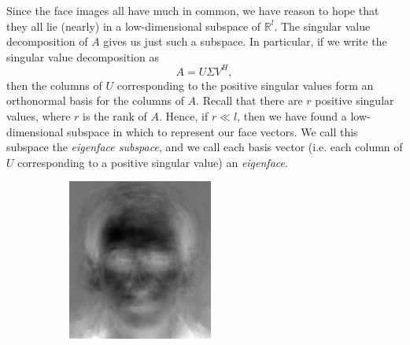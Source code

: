 Since the face images all have much in common, we have reason to hope that they all lie (nearly) in a low-dimensional subspace of $\mathbb{R}^l$.
The singular value decomposition of $A$ gives us just such a subspace.
In particular, if we write the singular value decomposition as
\[
A = U\Sigma V^H,
\]
then the columns of $U$ corresponding to the positive singular values form an orthonormal basis for the columns of $A$.
Recall that there are $r$ positive singular values, where $r$ is the rank of $A$.
Hence, if $r \ll l$, then we have found a low-dimensional subspace in which to represent our face vectors.
We call this subspace the \emph{eigenface subspace}, and we call each basis vector (i.e. each column of $U$ corresponding
to a positive singular value) an \emph{eigenface}.
\begin{figure}
\begin{subfigure}[b]{0.3\textwidth}
\includegraphics[width=\textwidth]{eigenface0.png}
\end{subfigure}
\begin{subfigure}[b]{0.3\textwidth}

\end{subfigure}
\end{figure}

